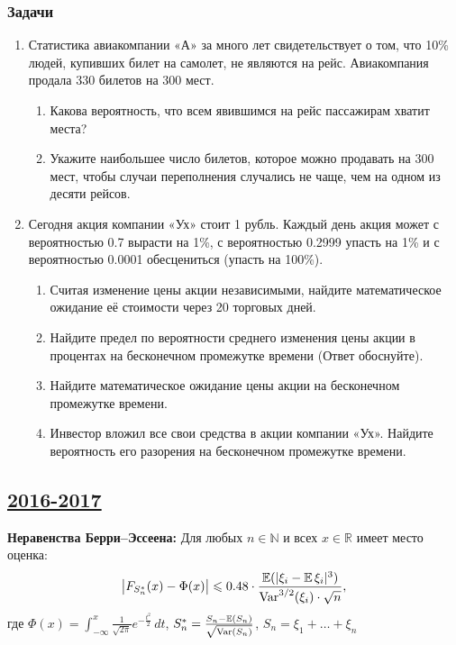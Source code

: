 \subsubsection*{Задачи}

\begin{enumerate}[resume]

\item Статистика авиакомпании «А» за много лет свидетельствует о том, что 10\% людей, купивших билет на самолет, не являются на рейс. Авиакомпания продала 330 билетов на 300 мест.
\begin{enumerate}
\item Какова вероятность, что всем явившимся на рейс пассажирам хватит места?
\item Укажите наибольшее число билетов, которое можно продавать на 300 мест, чтобы случаи переполнения случались не чаще, чем на одном из десяти рейсов.
\end{enumerate}

\item Сегодня акция компании «Ух» стоит 1 рубль. Каждый день акция может с вероятностью 0.7 вырасти на 1\%, с вероятностью 0.2999 упасть на 1\% и с вероятностью 0.0001 обесцениться (упасть на 100\%).
\begin{enumerate}
\item Считая изменение цены акции независимыми, найдите математическое ожидание её стоимости через 20 торговых дней.
\item Найдите предел по вероятности среднего изменения цены акции в процентах на бесконечном промежутке времени (Ответ обоснуйте).
\item Найдите математическое ожидание цены акции на бесконечном промежутке времени.
\item Инвестор вложил все свои средства в акции компании «Ух». Найдите вероятность его разорения на бесконечном промежутке времени.
\end{enumerate}
\end{enumerate}



\newpage
\subsection[2016-2017]{\hyperref[sec:sol_kr_02_2016_2017]{2016-2017}}
\label{sec:kr_02_2016_2017}

\textbf{Неравенства Берри–Эссеена:} Для любых $n \in \mathbb{N}$ и всех
$x \in \mathbb{R}$ имеет место оценка:
\[
\bigl|F_{S_n^{*}}(x) - \Phi(x)\bigr| \leqslant 0.48 \cdot \frac{\operatorname{\mathbb{E}}(|\xi_i - \operatorname{\mathbb{E}}\xi_i|^3)}{\operatorname{Var}^{3/2}(\xi_i)\cdot\sqrt{n}},
\]
где $\Phi(x) = \int_{-\infty}^{x}\frac{1}{\sqrt{2\pi}}e^{-\frac{t^2}{2}}\,dt$, \; $S_n^* = \frac{S_n - \operatorname{\mathbb{E}}(S_n)}{\sqrt{\operatorname{Var}(S_n)}}$, \; $S_n = \xi_1 + \ldots + \xi_n$

